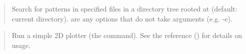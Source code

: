 \begin{quote}
Search for patterns in specified files in a directory tree rooted at 
(default: current directory).  are any  options
that do not take arguments (e.g. -e).
\end{quote}

\begin{quote}
Run a simple 2D plotter (the  command).
See the  reference ()
for details on usage.
\end{quote}

